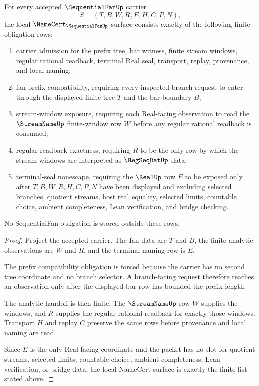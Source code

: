 \begin{theorem}\label{thm:sequential-fan-namecert-obligations}
For every accepted $\SequentialFanUp$ carrier
$$
S=(T,B,W,R,E,H,C,P,N),
$$
the local $\NameCert_{\SequentialFanUp}$ surface consists exactly of the following finite obligation rows:
\begin{enumerate}
\item carrier admission for the prefix tree, bar witness, finite stream windows, regular rational readback, terminal Real seal, transport, replay, provenance, and local naming;
\item fan-prefix compatibility, requiring every inspected branch request to enter through the displayed finite tree $T$ and the bar boundary $B$;
\item stream-window exposure, requiring each Real-facing observation to read the $\StreamNameUp$ finite-window row $W$ before any regular rational readback is consumed;
\item regular-readback exactness, requiring $R$ to be the only row by which the stream windows are interpreted as $\RegSeqRatUp$ data;
\item terminal-seal nonescape, requiring the $\RealUp$ row $E$ to be exposed only after $T,B,W,R,H,C,P,N$ have been displayed and excluding selected branches, quotient streams, host real equality, selected limits, countable choice, ambient completeness, Lean verification, and bridge checking.
\end{enumerate}
No SequentialFan obligation is stored outside these rows.
\end{theorem}
\begin{proof}
Project the accepted carrier. The fan data are $T$ and $B$, the finite analytic observations are $W$ and $R$, and the terminal naming row is $E$.

The prefix compatibility obligation is forced because the carrier has no second tree coordinate and no branch selector. A branch-facing request therefore reaches an observation only after the displayed bar row has bounded the prefix length.

The analytic handoff is then finite. The $\StreamNameUp$ row $W$ supplies the windows, and $R$ supplies the regular rational readback for exactly those windows. Transport $H$ and replay $C$ preserve the same rows before provenance and local naming are read.

Since $E$ is the only Real-facing coordinate and the packet has no slot for quotient streams, selected limits, countable choice, ambient completeness, Lean verification, or bridge data, the local NameCert surface is exactly the finite list stated above.
\end{proof}


